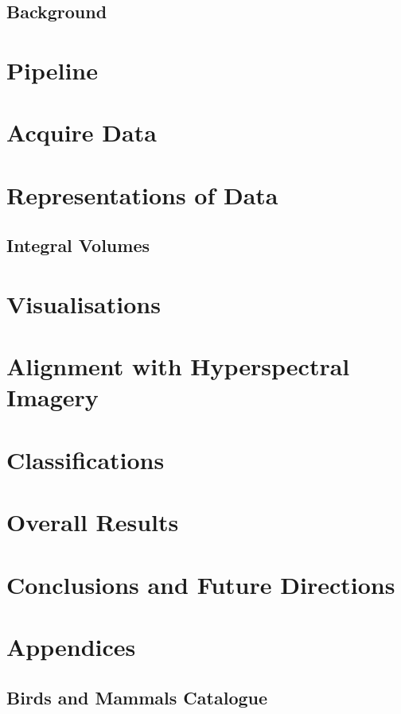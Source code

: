 \documentclass{article}
\begin{document}
		\subsection{Background}\label{Background}
			
			\newpage
    \section{Pipeline}\label{Pipeline}
	    
	    \newpage
    \section{Acquire Data}\label{AcquireData}
	    
	    \newpage
    \section{Representations of Data}\label{Representations}
	    
	    \newpage
		 \subsection{Integral Volumes}\label{Rep_IntegralVolumes}
		 	
		 		\newpage
		 		
	\section{Visualisations}\label{Visualisations}
		
		\newpage
	\section{Alignment with Hyperspectral Imagery}\label{Alignment}
		
		\newpage		
	\section{Classifications}\label{Classifications}
		
		\newpage
	\section{Overall Results}\label{Results}
		
		\newpage
	\section{Conclusions and Future Directions}\label{Conclusions}
		
		\newpage

	    
	    {}

		\newpage
	\section{Appendices}\label{Apendices}
		\subsection{Birds and Mammals Catalogue} 
		\label{AppendixBirds}
		\newpage
	
		
	
    
\end{document}
